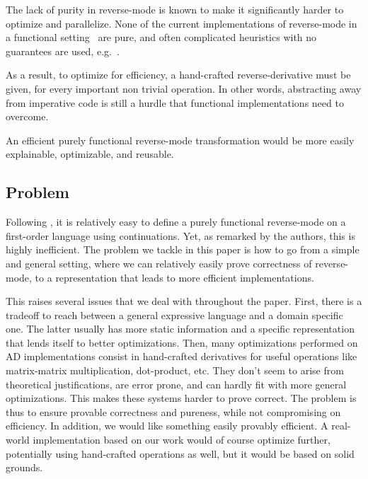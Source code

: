 The lack of purity in reverse-mode is known to make it significantly harder to optimize and parallelize. 
None of the current implementations of reverse-mode in a functional setting~\cite{lantern_icfp,pearlmutter2008reverse,baydin2016diffsharp} are pure, and often complicated heuristics with no guarantees are used, e.g.~\cite{xla}.

As a result, to optimize for efficiency, a hand-crafted reverse-derivative must be given, for every important non trivial operation.
In other words, abstracting away from imperative code is still a hurdle that functional implementations need to overcome.

An efficient purely functional reverse-mode transformation would be more easily explainable, optimizable, and reusable.


\subsection{Problem}

Following \cite{pearlmutter2008reverse}, it is relatively easy to define a purely functional reverse-mode on a first-order language using continuations. 
Yet, as remarked by the authors, this is highly inefficient. 
The problem we tackle in this paper is how to go from a simple and general setting, where we can relatively easily prove correctness of reverse-mode, 
to a representation that leads to more efficient implementations.

This raises several issues that we deal with throughout the paper. First, there is a tradeoff to reach between a general expressive language and a domain specific one. The latter usually has more static information and a specific representation that lends itself to better optimizations.
Then, many optimizations performed on AD implementations consist in hand-crafted derivatives for useful operations like matrix-matrix multiplication, dot-product, etc.
They don't seem to arise from theoretical justifications, are error prone, and can hardly fit with more general optimizations.
This makes these systems harder to prove correct. The problem is thus to ensure provable correctness and pureness, while not compromising on efficiency. In addition, we would like something easily provably efficient. 
A real-world implementation based on our work would of course optimize further, potentially using hand-crafted operations as well, but it would be based on solid grounds.

